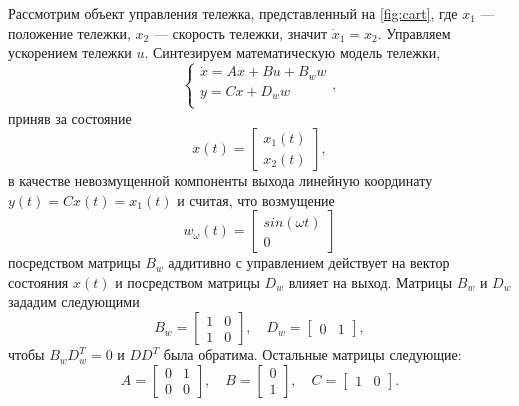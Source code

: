 Рассмотрим объект управления тележка, представленный на \autoref{fig:cart},
где $x_1$ --- положение тележки, $x_2$ --- скорость тележки, значит $\dot x_1=x_2$.
Управляем ускорением тележки $u$.
Синтезируем математическую модель тележки,
\begin{equation}
    \label{eq:sys}
    \begin{cases}
        \dot x=Ax+Bu+B_ww\\
        y=Cx+D_ww\\
    \end{cases},
\end{equation}
приняв за состояние
\begin{equation*}
    x(t)=\begin{bmatrix}
        x_1(t)\\
        x_2(t)
    \end{bmatrix},
\end{equation*}
в качестве невозмущенной компоненты выхода линейную координату
$y(t)=Cx(t)=x_1(t)$ и считая, что возмущение
\begin{equation*}
    w_\omega(t)=\begin{bmatrix}
        sin(\omega t)\\
        0
    \end{bmatrix}
\end{equation*}
посредством матрицы $B_w$
аддитивно с управлением действует на вектор состояния $x(t)$ и посредством матрицы $D_w$ 
влияет на выход. Матрицы $B_w$ и $D_w$ зададим следующими
\begin{equation*}
    B_w=\begin{bmatrix}
        1 & 0 \\
        1 & 0
    \end{bmatrix},\quad
    D_w=\begin{bmatrix}
        0 & 1
    \end{bmatrix},
\end{equation*}
чтобы $B_wD_w^T=0$ и $DD^T$ была обратима. Остальные матрицы следующие:
\begin{equation*}
    A=\begin{bmatrix}
        0 & 1 \\
        0 & 0
    \end{bmatrix},\quad
    B=\begin{bmatrix}
        0 \\
        1
    \end{bmatrix},\quad
    C=\begin{bmatrix}
        1 & 0
    \end{bmatrix}.
\end{equation*}

